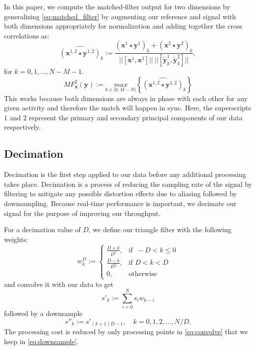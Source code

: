 \documentclass[conference]{IEEEtran}
\begin{document}
In this paper, we compute the matched-filter output for two dimensions by generalizing \eqref{eq:matched_filter} by augmenting our reference and signal with both dimensions appropriately for normalization and adding together the cross correlations as:
%
\begin{equation} \label{eq:cross_correlation_2}
\widehat{(\textbf{x}^{1,2} \star \textbf{y}^{1,2})}_k := \frac{(\textbf{x}^1 \star \textbf{y}^1)_k + (\textbf{x}^2 \star \textbf{y}^2)_k}{||[ \textbf{x}^1, \textbf{x}^2 ]|| \ || [ \widetilde{\textbf{y}}_k^1, \widetilde{\textbf{y}}_k^2 ] || },
\end{equation}
%
for $ k = 0,1,...,N-M-1 $. \\
%
\begin{equation} \label{eq:matched_filter_2}
MF_{\textbf{x}}^2(\textbf{y}) := \underset{k \in [0, M-N)}{max} \left \{\widehat{(\textbf{x}^{1,2} \star \textbf{y}^{1,2})}_k \right \}
\end{equation}
%
This works because both dimensions are always in phase with each other for any given activity and therefore the match will happen in sync. Here, the superscripts $1$ and $2$ represent the primary and secondary principal components of our data respectively.
%
\subsection{Decimation} \label{sec:decimation}
Decimation is the first step applied to our data before any additional processing takes place.
Decimation is a process of reducing the sampling rate of the signal by filtering to mitigate any possible distortion effects due to aliasing followed by downsampling.
Because real-time performance is important, we decimate our signal for the purpose of improving our throughput.

For a decimation value of $D$, we define our triangle filter with the following weights:
%
\begin{equation} \label{eq:triangle_filter_weights}
w_k^D :=
\begin{cases}
  \frac{D+k}{D^2}, & \text{if }\ -D < k \leq 0 \\
  \frac{D-k}{D^2}, & \text{if } D < k < D \\
  0, & \text{otherwise}
\end{cases}
\end{equation}
%
and convolve it with our data to get
%
\begin{equation} \label{eq:convolve}
s'_k := \sum_{i=0}^{N} s_i w_{k-i}
\end{equation}
%
followed by a downsample
%
\begin{equation} \label{eq:downsample}
s''_k := s'_{(k+1)D-1}, \quad k = 0, 1, 2, ..., N/D.
\end{equation}
%
The processing cost is reduced by only processing points in \eqref{eq:convolve} that we keep in \eqref{eq:downsample}.
%
\end{document}
